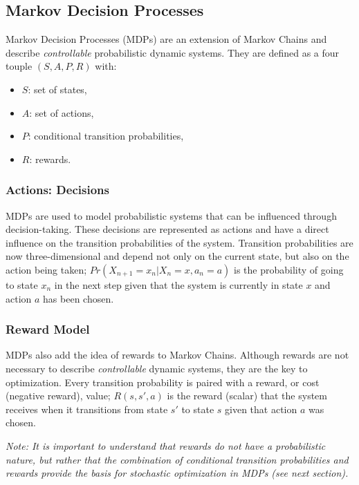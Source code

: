 \subsection{Markov Decision Processes}

Markov Decision Processes (MDPs) are an extension of Markov Chains and describe \textit{controllable} probabilistic dynamic systems. They are defined as a four touple $(S,A,P,R)$ with:
\begin{itemize}
\item $S$: set of states,
\item $A$: set of actions,
\item $P$: conditional transition probabilities,
\item $R$: rewards.
\end{itemize}

\subsubsection{Actions: Decisions}

MDPs are used to model probabilistic systems that can be influenced through decision-taking. These decisions are represented as actions and have a direct influence on the transition probabilities of the system. Transition probabilities are now three-dimensional and depend not only on the current state, but also on the action being taken; $Pr(X_{n+1}=x_n|X_n=x,a_n=a)$ is the probability of going to state $x_n$ in the next step given that the system is currently in state $x$ and action $a$ has been chosen.

\subsubsection{Reward Model}

MDPs also add the idea of rewards to Markov Chains. Although rewards are not necessary to describe \textit{controllable} dynamic systems, they are the key to optimization. Every transition probability is paired with a reward, or cost (negative reward), value; $R(s,s',a)$ is the reward (scalar) that the system receives when it transitions from state $s'$ to state $s$ given that action $a$ was chosen.

\textit{Note: It is important to understand that rewards do not have a probabilistic nature, but rather that the combination of conditional transition probabilities and rewards provide the basis for stochastic optimization in MDPs (see next section).}

